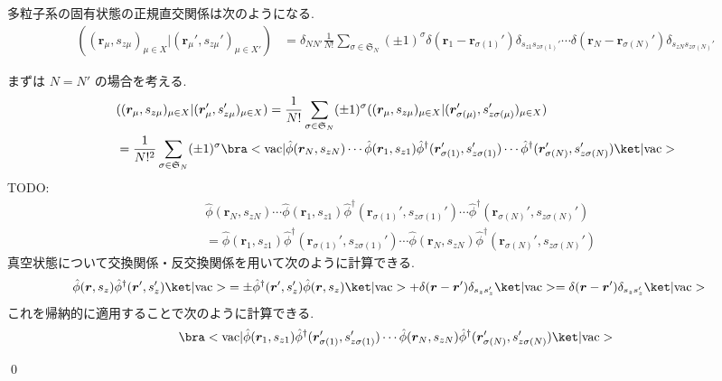 \documentclass[uplatex,dvipdfmx,a4paper,11pt]{jlreq}
\makeatletter
\renewcommand{\SS}{\mathfrak{S}}
\newcommand{\rr}{\bm{r}}
\numberwithin{equation}{section}
\theoremstyle{definition}
\renewenvironment{proof}[1][\proofname]{\par
  \normalfont
  \topsep6\p@\@plus6\p@ \trivlist
  \item[\hskip\labelsep{\bfseries #1}\@addpunct{\bfseries}]\ignorespaces\quad\par
}{
  \qed\endtrivlist\@endpefalse
}
\renewcommand\proofname{証明}
\makeatother
\begin{document}
\begin{theorem}[Q21-86(ii)]
  多粒子系の固有状態の正規直交関係は次のようになる.
  \begin{align}
    ((\rr_{\mu}, s_{z\mu})_{\mu\in X}|(\rr_{\mu}', s_{z\mu}')_{\mu\in X'}) & = \delta_{NN'}\frac{1}{N!}\sum_{\sigma\in\SS_N}(\pm 1)^\sigma\delta(\rr_1 - \rr_{\sigma(1)}')\delta_{s_{z1}s_{z\sigma(1)}'}\cdots\delta(\rr_N - \rr_{\sigma(N)}')\delta_{s_{zN}s_{z\sigma(N)}'}
  \end{align}
\end{theorem}
\begin{proof}
  まずは $N = N'$ の場合を考える.
  \begin{align}
     & ((\rr_{\mu}, s_{z\mu})_{\mu\in X}|(\rr_{\mu}', s_{z\mu}')_{\mu\in X}) = \frac{1}{N!}\sum_{\sigma\in\SS_N}(\pm 1)^\sigma((\rr_{\mu}, s_{z\mu})_{\mu\in X}|(\rr_{\sigma(\mu)}', s_{z\sigma(\mu)}')_{\mu\in X})                                                    \\
     & = \frac{1}{N!^2}\sum_{\sigma\in\SS_N}(\pm 1)^\sigma\bra<\mathrm{vac}|\hat{\phi}(\rr_N, s_{zN})\cdots\hat{\phi}(\rr_1, s_{z1})\hat{\phi}^\dagger(\rr_{\sigma(1)}', s_{z\sigma(1)}')\cdots\hat{\phi}^\dagger(\rr_{\sigma(N)}', s_{z\sigma(N)}')\ket|\mathrm{vac}>
  \end{align}
  TODO:
  \begin{align}
     & \hat{\phi}(\rr_N, s_{zN})\cdots\hat{\phi}(\rr_1, s_{z1})\hat{\phi}^\dagger(\rr_{\sigma(1)}', s_{z\sigma(1)}')\cdots\hat{\phi}^\dagger(\rr_{\sigma(N)}', s_{z\sigma(N)}') \\
     & = \hat{\phi}(\rr_1, s_{z1})\hat{\phi}^\dagger(\rr_{\sigma(1)}', s_{z\sigma(1)}')\cdots\hat{\phi}(\rr_N, s_{zN})\hat{\phi}^\dagger(\rr_{\sigma(N)}', s_{z\sigma(N)}')
  \end{align}
  真空状態について交換関係・反交換関係を用いて次のように計算できる.
  \begin{align}
    \hat{\phi}(\rr, s_z)\hat{\phi}^\dagger(\rr', s_z')\ket|\mathrm{vac}> & = \pm\hat{\phi}^\dagger(\rr', s_z')\hat{\phi}(\rr, s_z)\ket|\mathrm{vac}> + \delta(\rr - \rr')\delta_{s_zs_z'}\ket|\mathrm{vac}> = \delta(\rr - \rr')\delta_{s_zs_z'}\ket|\mathrm{vac}>
  \end{align}
  これを帰納的に適用することで次のように計算できる.
  \begin{align}
     & \bra<\mathrm{vac}|\hat{\phi}(\rr_1, s_{z1})\hat{\phi}^\dagger(\rr_{\sigma(1)}', s_{z\sigma(1)}')\cdots\hat{\phi}(\rr_N, s_{zN})\hat{\phi}^\dagger(\rr_{\sigma(N)}', s_{z\sigma(N)}')\ket|\mathrm{vac}> \\

\end{align}
\end{proof}
\end{document}
